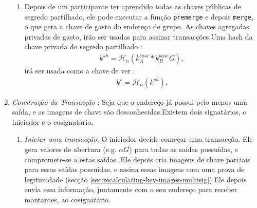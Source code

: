 \begin{enumerate}
\begin{enumerate}
        \item Depois de um participante ter aprendido todas as chaves públicas de segredo partilhado, ele pode executar a função {\tt premerge} e depois {\tt merge}, o que gera a chave de gasto do endereço de grupo. As chaves agregadas privadas de gasto, irão ser usadas para assinar transacções.\newline Uma hash da chave privada do segredo partilhado :
\begin{align*}
k^{sh} = \mathcal{H}_n(k^{base}_A*k^{base}_B G) ,
\end{align*}
irá ser usada como a chave de ver : 
\begin{align*}
k^v = \mathcal{H}_n(k^{sh}) .
\end{align*}
    \end{enumerate}{}
    \item {\em Construção da Transacção }: Seja que o endereço já possui pelo menos uma saída, e as imagens de chave são desconhecidas.\newline Existem dois signatários, o iniciador e o cosignatário.
    \begin{enumerate}
        \item {\em Iniciar uma transacção}: O iniciador decide começar uma transacção. Ele gera valores de abertura (e.g. $\alpha G$) para todas as saídas possuídas, e compromete-se a estas saídas. \newline Ele depois cria imagens de chave parciais para essas saídas possuídas, e assina essas imagens com uma prova de legitimidade (secção \ref{sec:recalculating-key-images-multisig}).\newline Ele depois envia essa informação, juntamente com o seu endereço para receber montantes, ao cosignatário.


\end{enumerate}
\end{enumerate}
